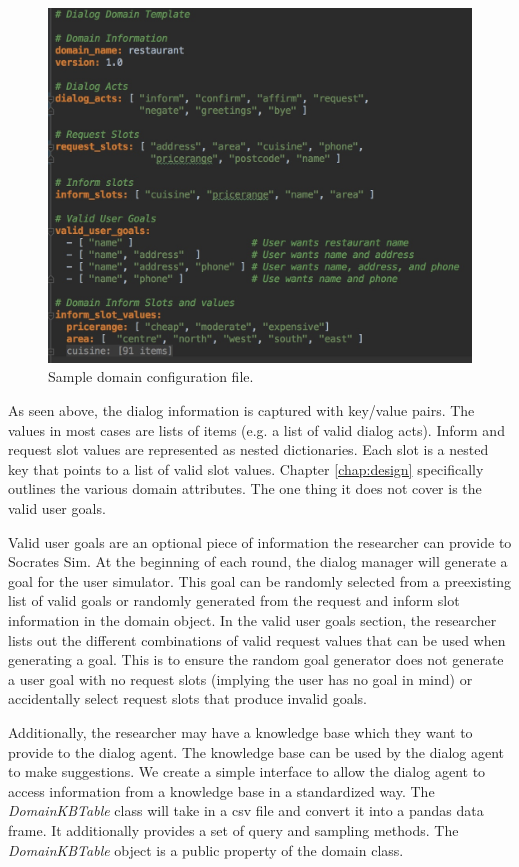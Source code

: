 \begin{figure}[h!]
	\centering
	\includegraphics[scale=.25]{diagrams/sample_domain.jpeg}
	\caption{ Sample domain configuration file. }
	\label{fig:sample_domain}
\end{figure}

As seen above, the dialog information is captured with key/value pairs. The values in most cases are lists of items (e.g. a list of valid dialog acts). Inform and request slot values are represented as nested dictionaries. Each slot is a nested key that points to a list of valid slot values. Chapter \ref{chap:design} specifically outlines the various domain attributes. The one thing it does not cover is the valid user goals. 

Valid user goals are an optional piece of information the researcher can provide to Socrates Sim. At the beginning of each round, the dialog manager will generate a goal for the user simulator. This goal can be randomly selected from a preexisting list of valid goals or randomly generated from the request and inform slot information in the domain object. In the valid user goals section, the researcher lists out the different combinations of valid request values that can be used when generating a goal. This is to ensure the random goal generator does not generate a user goal with no request slots (implying the user has no goal in mind) or accidentally select request slots that produce invalid goals.  

Additionally, the researcher may have a knowledge base which they want to provide to the dialog agent. The knowledge base can be used by the dialog agent to make suggestions. We create a simple interface to allow the dialog agent to access information from a knowledge base in a standardized way. The \textit{DomainKBTable} class will take in a csv file and convert it into a pandas data frame. It additionally provides a set of query and sampling methods. The \textit{DomainKBTable} object is a public property of the domain class.

